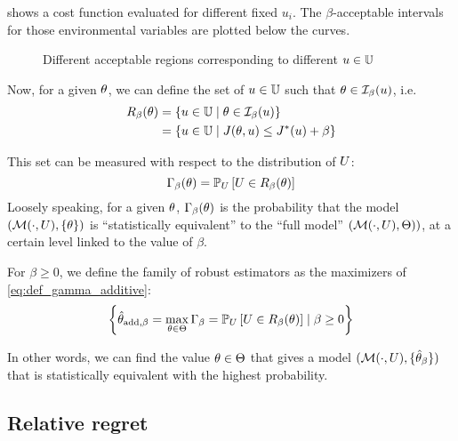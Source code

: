 \documentclass[../../Main_ManuscritThese.tex]{subfiles}
\newcommand\imgpath{/home/victor/acadwriting/Manuscrit/Text/Chapter3/img/}
\begin{document}
 shows a cost function evaluated for different fixed $u_i$. The $\beta$-acceptable intervals for those environmental variables are plotted below the curves.
\begin{figure}[ht]
  \centering
  
  \caption{\label{fig:lik_interval_threshold} Different acceptable regions corresponding to different $u \in \mathbb{U}$}
\end{figure}

  Now, for a given $\theta$, we can define the set of $u\in \mathbb{U}$ such that $\theta \in  \mathcal{I}_{\beta}(u)$, i.e.\
  \begin{align}
    R_{\beta}(\theta) &= \left\{u\in \mathbb{U} \mid \theta \in \mathcal{I}_{\beta}(u) \right\} \\
           &= \left\{u\in \mathbb{U} \mid J(\theta, u)  \leq J^*(u) + \beta \right\}
  \end{align}

  This set can be measured with respect to the distribution of $U$:
  \begin{equation}
    \label{eq:def_gamma_additive}
    \Gamma_\beta(\theta) = \mathbb{P}_U\left[U \in R_{\beta}(\theta)\right]
  \end{equation}
  Loosely speaking, for a given $\theta$, $\Gamma_{\beta}(\theta)$ is the probability that the model $(\mathcal{M}(\cdot, U), \{\theta\})$ is ``statistically equivalent'' to the ``full model'' $\left(\mathcal{M}(\cdot, U), \Theta)\right)$, at a certain level linked to the value of $\beta$.

  \begin{definition}
    For $\beta \geq 0$, we define the family of robust estimators as the maximizers of \cref{eq:def_gamma_additive}:
    \begin{equation}
      \left\{\hat{\theta}_{\mathrm{add,\beta}} = \max_{\theta\in\Theta} \Gamma_{\beta}= \mathbb{P}_U\left[U \in R_{\beta}(\theta)\right]\mid \beta \geq 0\right\}
    \end{equation}
  \end{definition}

  In other words, we can find the value $\theta\in\Theta$ that gives a model $(\mathcal{M}(\cdot, U), \{\hat{\theta}_{\mathrm{\beta}}\})$ that is statistically equivalent with the highest probability.


  
  \subsection{Relative regret}
\end{document}
